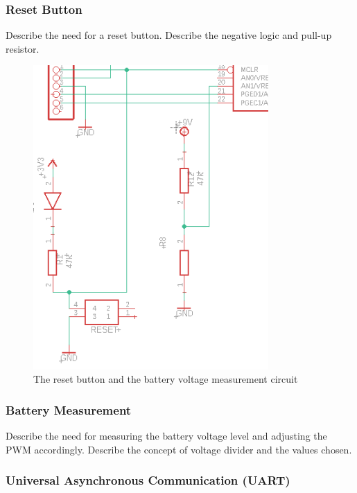 \subsubsection{Reset Button}

Describe the need for a reset button.
Describe the negative logic and pull-up resistor.

\begin{figure}[htb]
    \centering
    \includegraphics[width=0.8\textwidth]{figures/hardware/MCLRandBatteryMeasurement.PNG}
    \caption{The reset button and the battery voltage measurement circuit}
    \label{fig:reset}
\end{figure}

\FloatBarrier


\subsubsection{Battery Measurement}

Describe the need for measuring the battery voltage level
and adjusting the PWM accordingly. 
Describe the concept of voltage divider and the values chosen.


\subsubsection{Universal Asynchronous Communication (UART)}


